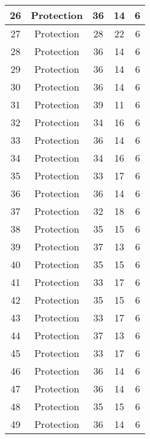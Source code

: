 \documentclass[results.tex]{subfiles}
\begin{document}
\begin{center}
\begin{tabular}{| c || c | c | c | c |}
    \hline
    26 & Protection & 36 & 14 & 6 \\ 
    \hline
    27 & Protection & 28 & 22 & 6 \\ 
    \hline
    28 & Protection & 36 & 14 & 6 \\ 
    \hline
    29 & Protection & 36 & 14 & 6 \\ 
    \hline
    30 & Protection & 36 & 14 & 6 \\ 
    \hline
    31 & Protection & 39 & 11 & 6 \\ 
    \hline
    32 & Protection & 34 & 16 & 6 \\ 
    \hline
    33 & Protection & 36 & 14 & 6 \\ 
    \hline
    34 & Protection & 34 & 16 & 6 \\ 
    \hline
    35 & Protection & 33 & 17 & 6 \\ 
    \hline
    36 & Protection & 36 & 14 & 6 \\ 
    \hline
    37 & Protection & 32 & 18 & 6 \\ 
    \hline
    38 & Protection & 35 & 15 & 6 \\ 
    \hline
    39 & Protection & 37 & 13 & 6 \\ 
    \hline
    40 & Protection & 35 & 15 & 6 \\ 
    \hline
    41 & Protection & 33 & 17 & 6 \\ 
    \hline
    42 & Protection & 35 & 15 & 6 \\ 
    \hline
    43 & Protection & 33 & 17 & 6 \\ 
    \hline
    44 & Protection & 37 & 13 & 6 \\ 
    \hline
    45 & Protection & 33 & 17 & 6 \\ 
    \hline
    46 & Protection & 36 & 14 & 6 \\ 
    \hline
    47 & Protection & 36 & 14 & 6 \\ 
    \hline
    48 & Protection & 35 & 15 & 6 \\ 
    \hline
    49 & Protection & 36 & 14 & 6 \\ 
    \hline   \end{tabular}
\end{center}
\end{document}
